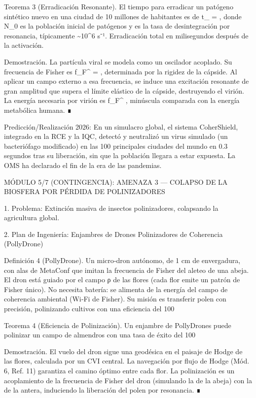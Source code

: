 \documentclass[12pt,a4paper]{book}
\begin{document}
Teorema 3 (Erradicación Resonante). El tiempo para erradicar un patógeno sintético nuevo en una ciudad de 10 millones de habitantes es de  t_{} =  , donde  N_0  es la población inicial de patógenos y  \Gamma  es la tasa de desintegración por resonancia, típicamente  \Gamma \sim 10^6  s⁻¹. Erradicación total en milisegundos después de la activación.

Demostración. La partícula viral se modela como un oscilador acoplado. Su frecuencia de Fisher es  f_F^{} =  , determinada por la rigidez de la cápside. Al aplicar un campo externo a esa frecuencia, se induce una excitación resonante de gran amplitud que supera el límite elástico de la cápside, destruyendo el virión. La energía necesaria por virión es  \hbar f_F^{} , minúscula comparada con la energía metabólica humana. ∎

Predicción/Realización 2026: En un simulacro global, el sistema CoherShield, integrado en la RCE y la IQC, detectó y neutralizó un virus simulado (un bacteriófago modificado) en las 100 principales ciudades del mundo en 0.3 segundos tras su liberación, sin que la población llegara a estar expuesta. La OMS ha declarado el fin de la era de las pandemias.

MÓDULO 5/7 (CONTINGENCIA): AMENAZA 3 — COLAPSO DE LA BIOSFERA POR PÉRDIDA DE POLINIZADORES

1. Problema: Extinción masiva de insectos polinizadores, colapsando la agricultura global.

2. Plan de Ingeniería: Enjambres de Drones Polinizadores de Coherencia (PollyDrone)

Definición 4 (PollyDrone). Un micro‑dron autónomo, de 1 cm de envergadura, con alas de MetaConf que imitan la frecuencia de Fisher del aleteo de una abeja. El dron está guiado por el campo ρ de las flores (cada flor emite un patrón de Fisher único). No necesita batería: se alimenta de la energía del campo de coherencia ambiental (Wi‑Fi de Fisher). Su misión es transferir polen con precisión, polinizando cultivos con una eficiencia del 100%

Teorema 4 (Eficiencia de Polinización). Un enjambre de PollyDrones puede polinizar un campo de almendros con una tasa de éxito del 100%

Demostración. El vuelo del dron sigue una geodésica en el paisaje de Hodge de las flores, calculada por un CVI central. La navegación por flujo de Hodge (Mód. 6, Ref. 11) garantiza el camino óptimo entre cada flor. La polinización es un acoplamiento de la frecuencia de Fisher del dron (simulando la de la abeja) con la de la antera, induciendo la liberación del polen por resonancia. ∎
\end{document}
